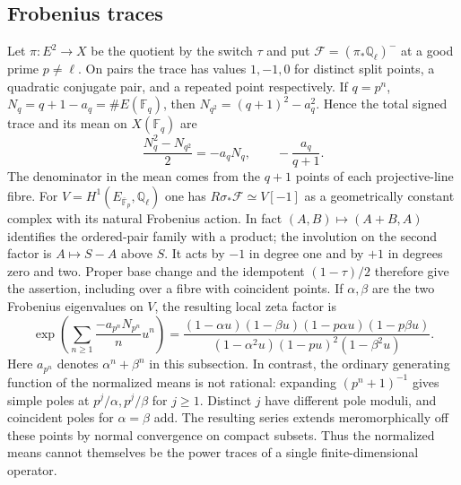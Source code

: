 \documentclass[11pt]{article}
\newcommand{\Q}{\mathbb{Q}}
\newcommand{\F}{\mathbb{F}}
\begin{document}
\subsection{Frobenius traces}
Let $\pi:E^2\to X$ be the quotient by the switch $\tau$ and put
$\mathcal F=(\pi_*\Q_\ell)^-$ at a good prime $p\ne\ell$.
On pairs the trace has values $1,-1,0$ for distinct split points,
a quadratic conjugate pair, and a repeated point respectively. If
$q=p^n$, $N_q=q+1-a_q=\#E(\F_q)$, then $N_{q^2}=(q+1)^2-a_q^2$.
Hence the total signed trace and its mean on $X(\F_q)$ are
\[
 \frac{N_q^2-N_{q^2}}2=-a_q N_q,\qquad -\frac{a_q}{q+1}.
\]
The denominator in the mean comes from the $q+1$ points of each
projective-line fibre. For $V=H^1(E_{\overline{\F}_p},\Q_\ell)$ one has
$R\sigma_*\mathcal F\simeq V[-1]$ as a geometrically constant
complex with its natural Frobenius action. In fact
$(A,B)\mapsto(A+B,A)$ identifies the ordered-pair family with a
product; the involution on the second factor is $A\mapsto S-A$
above $S$. It acts by $-1$ in degree one and by $+1$ in degrees
zero and two. Proper base change and the idempotent $(1-\tau)/2$
therefore give the assertion, including over a fibre with coincident
points. If $\alpha,\beta$ are the two Frobenius eigenvalues on $V$,
the resulting local zeta factor is
\[
 \exp\left(\sum_{n\ge1}\frac{-a_{p^n}N_{p^n}}n u^n\right)=
 \frac{(1-\alpha u)(1-\beta u)(1-p\alpha u)(1-p\beta u)}
 {(1-\alpha^2u)(1-pu)^2(1-\beta^2u)} .
\]
Here $a_{p^n}$ denotes $\alpha^n+\beta^n$ in this subsection.
In contrast, the ordinary generating function of the normalized
means is not rational: expanding $(p^n+1)^{-1}$ gives simple poles
at $p^j/\alpha,p^j/\beta$ for $j\ge1$. Distinct $j$ have different
pole moduli, and coincident poles for $\alpha=\beta$ add. The resulting
series extends meromorphically off these points by normal convergence
on compact subsets. Thus the normalized means cannot themselves be
the power traces of a single finite-dimensional operator.
\end{document}
